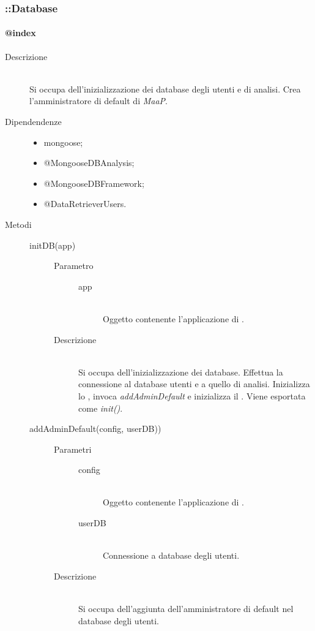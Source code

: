 \subsubsection{::Database}
\paragraph{@index}
\begin{description}
 \item[Descrizione] \hfill \\
 Si occupa dell'inizializzazione dei database degli utenti e di analisi. Crea l'amministratore di default di \textit{MaaP}.
 \item[Dipendendenze] \hfill
   \begin{itemize}
   \item mongoose;
   \item @MongooseDBAnalysis;
   \item @MongooseDBFramework;
   \item @DataRetrieverUsers.
   \end{itemize}
 \item[Metodi] \hfill
 \begin{description}
 \item[initDB(app)] \hfill 
 \begin{description}
    		\item[Parametro] \hfill
    			\begin{description}
    				\item[app] \hfill \\
    				Oggetto contenente l'applicazione di .
    			\end{description}
    		\item[Descrizione] \hfill \\
    		Si occupa dell'inizializzazione dei database. Effettua la connessione al database utenti e a quello di analisi. Inizializza lo , invoca \textit{addAdminDefault} e inizializza il . Viene esportata come \textit{init()}.
    	\end{description}
  \item[addAdminDefault(config, userDB))] \hfill 
  \begin{description}
      		\item[Parametri] \hfill
      			\begin{description}
      				\item[config] \hfill \\
      				Oggetto contenente l'applicazione di .
      				\item[userDB] \hfill \\
      				Connessione a database degli utenti.
      			\end{description}
      		\item[Descrizione] \hfill \\
      		Si occupa dell'aggiunta dell'amministratore di default nel database degli utenti.
      	\end{description}
  
 \end{description}
\end{description}


